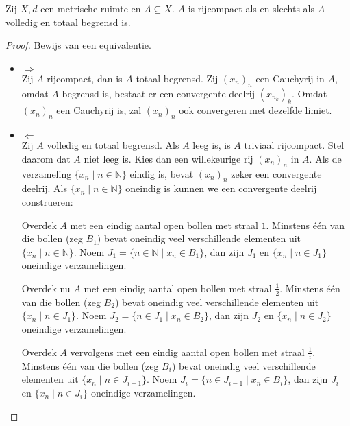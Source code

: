 \documentclass[main.tex]{subfiles}
\begin{document}
\begin{bst}
  Zij $X,d$ een metrische ruimte en $A \subseteq X$.
  $A$ is rijcompact als en slechts als $A$ volledig en totaal begrensd is.

  \begin{proof}
    Bewijs van een equivalentie.
    \begin{itemize}
    \item $\Rightarrow$\\
      Zij $A$ rijcompact, dan is $A$ totaal begrensd.
      Zij $(x_{n})_{n}$ een Cauchyrij in $A$, omdat $A$ begrensd is, bestaat er een convergente deelrij $(x_{n_{k}})_{k}$.
      Omdat $(x_{n})_{n}$ een Cauchyrij is, zal $(x_{n})_{n}$ ook convergeren met dezelfde limiet.
    \item $\Leftarrow$\\
      Zij $A$ volledig en totaal begrensd.
      Als $A$ leeg is, is $A$ triviaal rijcompact.
      Stel daarom dat $A$ niet leeg is.
      Kies dan een willekeurige rij $(x_{n})_{n}$ in $A$.
      Als de verzameling $\{x_{n}\mid n\in \mathbb{N}\}$ eindig is, bevat $(x_{n})_{n}$ zeker een convergente deelrij.\waarom
      Als $\{x_{n}\mid n\in \mathbb{N}\}$ oneindig is kunnen we een convergente deelrij construeren:
      
      Overdek $A$ met een eindig aantal open bollen met straal $1$.
      Minstens \'e\'en van die bollen (zeg $B_{1}$) bevat oneindig veel verschillende elementen uit $\{x_{n}\mid n\in \mathbb{N}\}$.
      Noem $J_{1}= \{n\in \mathbb{N} \mid x_{n}\in B_{1}\}$, dan zijn $J_{1}$ en $\{x_{n}\mid n\in J_{1}\}$ oneindige verzamelingen.
      
      Overdek nu $A$ met een eindig aantal open bollen met straal $\frac{1}{2}$.
      Minstens \'e\'en van die bollen (zeg $B_{2}$) bevat oneindig veel verschillende elementen uit $\{x_{n}\mid n\in J_{1}\}$.
      Noem $J_{2}= \{n\in J_{1} \mid x_{n}\in B_{2}\}$, dan zijn $J_{2}$ en $\{x_{n}\mid n\in J_{2}\}$ oneindige verzamelingen.

      Overdek $A$ vervolgens met een eindig aantal open bollen met straal $\frac{1}{i}$.
      Minstens \'e\'en van die bollen (zeg $B_{i}$) bevat oneindig veel verschillende elementen uit $\{x_{n}\mid n\in J_{i-1}\}$.
      Noem $J_{i}= \{n\in J_{i-1} \mid x_{n}\in B_{i}\}$, dan zijn $J_{i}$ en $\{x_{n}\mid n\in J_{i}\}$ oneindige verzamelingen.
      

\end{itemize}
\end{proof}
\end{bst}
\end{document}
